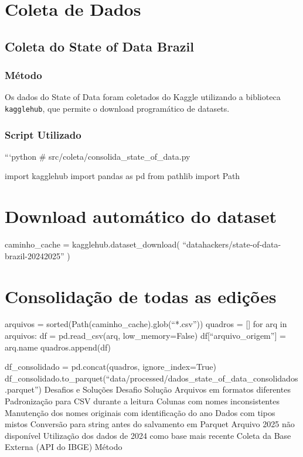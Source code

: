\documentclass[
  11pt,
  letterpaper,
  DIV=11,
  numbers=noendperiod]{scrartcl}
\begin{document}
\section{Coleta de Dados}\label{coleta-de-dados}

\subsection{Coleta do State of Data
Brazil}\label{coleta-do-state-of-data-brazil}

\subsubsection{Método}\label{muxe9todo}

Os dados do State of Data foram coletados do Kaggle utilizando a
biblioteca \texttt{kagglehub}, que permite o download programático de
datasets.

\subsubsection{Script Utilizado}\label{script-utilizado}

```python \# src/coleta/consolida\_state\_of\_data.py

import kagglehub import pandas as pd from pathlib import Path

\section{Download automático do
dataset}\label{download-automuxe1tico-do-dataset}

caminho\_cache = kagglehub.dataset\_download(
``datahackers/state-of-data-brazil-20242025'' )

\section{Consolidação de todas as
edições}\label{consolidauxe7uxe3o-de-todas-as-ediuxe7uxf5es}

arquivos = sorted(Path(caminho\_cache).glob(``*.csv'')) quadros = {[}{]}
for arq in arquivos: df = pd.read\_csv(arq, low\_memory=False)
df{[}``arquivo\_origem''{]} = arq.name quadros.append(df)

df\_consolidado = pd.concat(quadros, ignore\_index=True)
df\_consolidado.to\_parquet(``data/processed/dados\_state\_of\_data\_consolidados.parquet'')
Desafios e Soluções Desafio Solução Arquivos em formatos diferentes
Padronização para CSV durante a leitura Colunas com nomes inconsistentes
Manutenção dos nomes originais com identificação do ano Dados com tipos
mistos Conversão para string antes do salvamento em Parquet Arquivo 2025
não disponível Utilização dos dados de 2024 como base mais recente
Coleta da Base Externa (API do IBGE) Método
\end{document}
